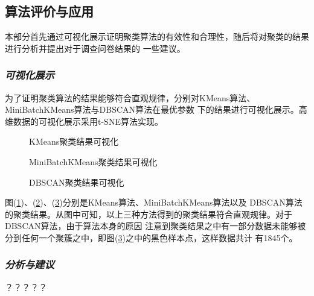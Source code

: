 \documentclass{acm_proc_article-sp}
\begin{document}



\subsection{\textsf{算法评价与应用}}
本部分首先通过可视化展示证明聚类算法的有效性和合理性，随后将对聚类的结果进行分析并提出对于调查问卷结果的
一些建议。

\subsubsection{\textit{可视化展示}}
为了证明聚类算法的结果能够符合直观规律，分别对KMeans算法、MiniBatchKMeans算法与DBSCAN算法在最优参数
下的结果进行可视化展示。高维数据的可视化展示采用t-SNE算法实现。

\begin{figure}[!htb]
\centering
{}
\caption{KMeans聚类结果可视化}
\label{PKM}
\end{figure}

\begin{figure}[!htb]
\centering
{}
\caption{MiniBatchKMeans聚类结果可视化}
\label{PMK}
\end{figure}

\begin{figure}[!htb]
\centering
{}
\caption{DBSCAN聚类结果可视化}
\label{PDS}
\end{figure}

图(\ref{PKM})、(\ref{PMK})、(\ref{PDS})分别是KMeans算法、MiniBatchKMeans算法以及
DBSCAN算法的聚类结果。从图中可知，以上三种方法得到的聚类结果符合直观规律。对于DBSCAN算法，由于算法本身的原因
注意到聚类结果之中有一部分数据未能够被分到任何一个聚簇之中，即图(\ref{PDS})之中的黑色样本点，这样数据共计
有1845个。

\subsubsection{\textit{分析与建议}}
？？？？？
\end{document}
